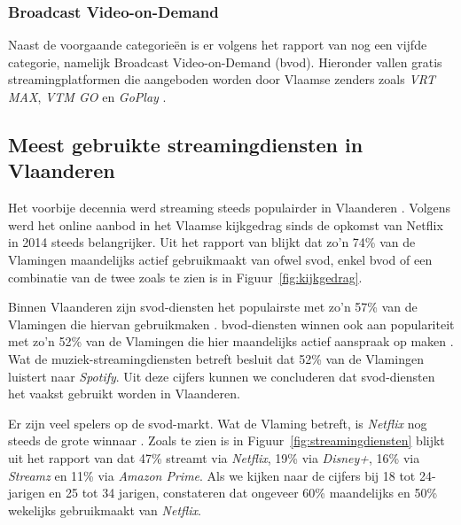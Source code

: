 \vspace{0.5em}

\subsubsection{Broadcast Video-on-Demand}

Naast de voorgaande categorieën is er volgens het rapport van \textcite{Digimeter2024} nog een vijfde categorie, namelijk Broadcast Video-on-Demand (\acrshort{bvod}). Hieronder vallen gratis streamingplatformen die aangeboden worden door Vlaamse zenders zoals \textit{VRT MAX}, \textit{VTM GO} en \textit{GoPlay} \autocite{Digimeter2024}.

\vspace{1em}

\subsection{Meest gebruikte streamingdiensten in Vlaanderen}
\label{subsec:populaire-streaming}

\vspace{1em}

Het voorbije decennia werd streaming steeds populairder in Vlaanderen \autocite{Digimeter2024}. Volgens \textcite{Digimeter2024} werd het online aanbod in het Vlaamse kijkgedrag sinds de opkomst van Netflix in 2014 steeds belangrijker. Uit het rapport van \textcite{Digimeter2024} blijkt dat zo'n 74\% van de Vlamingen maandelijks actief gebruikmaakt van ofwel \acrshort{svod}, enkel \acrshort{bvod} of een combinatie van de twee zoals te zien is in Figuur~\ref{fig:kijkgedrag}. 

\vspace{1em}

Binnen Vlaanderen zijn \acrlong{svod}-diensten het populairste met zo'n 57\% van de Vlamingen die hiervan gebruikmaken \autocite{Digimeter2024}. \acrlong{bvod}-diensten winnen ook aan populariteit met zo'n 52\% van de Vlamingen die hier maandelijks actief aanspraak op maken \autocite{Digimeter2024}. Wat de muziek-streamingdiensten betreft besluit \textcite{Digimeter2024} dat 52\% van de Vlamingen luistert naar \textit{Spotify}. Uit deze cijfers kunnen we concluderen dat \acrshort{svod}-diensten het vaakst gebruikt worden in Vlaanderen.

\vspace{1em}

Er zijn veel spelers op de \acrshort{svod}-markt. Wat de Vlaming betreft, is \textit{Netflix} nog steeds de grote winnaar \autocite{Digimeter2024}. Zoals te zien is in Figuur~\ref{fig:streamingdiensten} blijkt uit het rapport van \textcite{Digimeter2024} dat 47\% streamt via \textit{Netflix}, 19\% via \textit{Disney+}, 16\% via \textit{Streamz} en 11\% via \textit{Amazon Prime}. Als we kijken naar de cijfers bij 18 tot 24-jarigen en 25 tot 34 jarigen, constateren \textcite{Digimeter2024} dat ongeveer 60\% maandelijks en 50\% wekelijks gebruikmaakt van \textit{Netflix}.

